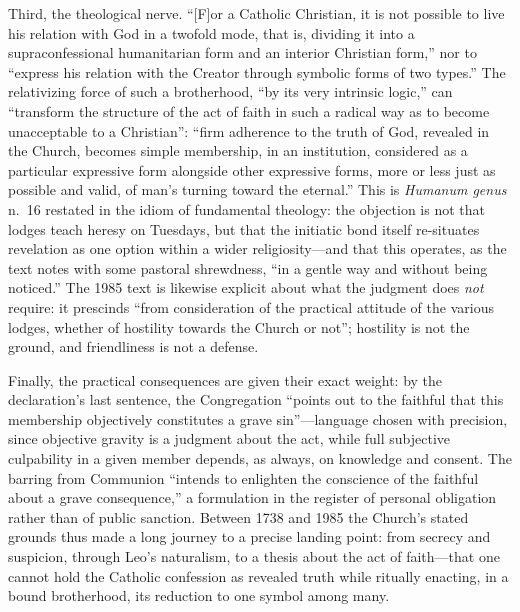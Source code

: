 Third, the theological nerve. ``[F]or a Catholic Christian, it is not possible to live his relation with God in a twofold mode, that is, dividing it into a supraconfessional humanitarian form and an interior Christian form,'' nor to ``express his relation with the Creator through symbolic forms of two types.'' The relativizing force of such a brotherhood, ``by its very intrinsic logic,'' can ``transform the structure of the act of faith in such a radical way as to become unacceptable to a Christian'': ``firm adherence to the truth of God, revealed in the Church, becomes simple membership, in an institution, considered as a particular expressive form alongside other expressive forms, more or less just as possible and valid, of man's turning toward the eternal.'' This is \emph{Humanum genus} n.~16 restated in the idiom of fundamental theology: the objection is not that lodges teach heresy on Tuesdays, but that the initiatic bond itself re-situates revelation as one option within a wider religiosity---and that this operates, as the text notes with some pastoral shrewdness, ``in a gentle way and without being noticed.'' The 1985 text is likewise explicit about what the judgment does \emph{not} require: it prescinds ``from consideration of the practical attitude of the various lodges, whether of hostility towards the Church or not''; hostility is not the ground, and friendliness is not a defense.

Finally, the practical consequences are given their exact weight: by the declaration's last sentence, the Congregation ``points out to the faithful that this membership objectively constitutes a grave sin''---language chosen with precision, since objective gravity is a judgment about the act, while full subjective culpability in a given member depends, as always, on knowledge and consent. The barring from Communion ``intends to enlighten the conscience of the faithful about a grave consequence,'' a formulation in the register of personal obligation rather than of public sanction. Between 1738 and 1985 the Church's stated grounds thus made a long journey to a precise landing point: from secrecy and suspicion, through Leo's naturalism, to a thesis about the act of faith---that one cannot hold the Catholic confession as revealed truth while ritually enacting, in a bound brotherhood, its reduction to one symbol among many.
